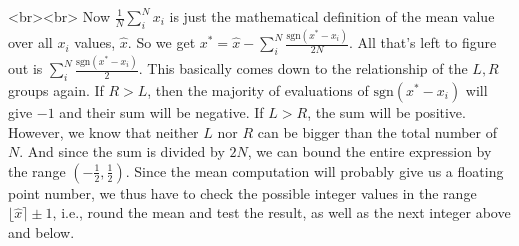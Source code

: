<br><br>
Now $\frac{1}{N}\sum_i^N x_i$ is just the mathematical definition of the mean value over all $x_i$ values, $\hat{x}$. So we get $x^\ast = \hat{x} - \sum_i^N \frac{\text{sgn}(x^\ast-x_i)}{2N}$. All that's left to figure out is $\sum_i^N \frac{\text{sgn}(x^\ast-x_i)}{2}$. This basically comes down to the relationship of the $L,R$ groups again. If $R > L$, then the majority of evaluations of $\text{sgn}(x^\ast-x_i)$ will give $-1$ and their sum will be negative. If $L > R$, the sum will be positive. However, we know that neither $L$ nor $R$ can be bigger than the total number of $N$. And since the sum is divided by $2N$, we can bound the entire expression by the range $(-\frac{1}{2},\frac{1}{2})$. Since the mean computation will probably give us a floating point number, we thus have to check the possible integer values in the range $\lfloor \hat{x} \rceil \pm 1$, i.e., round the mean and test the result, as well as the next integer above and below.